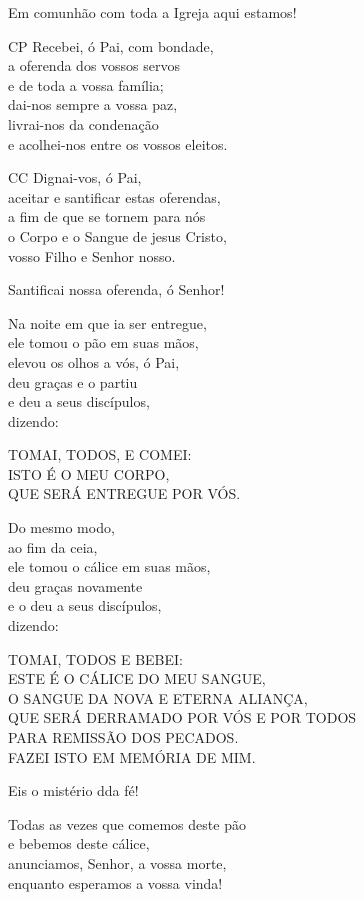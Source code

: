\documentclass{book}
\begin{document}
\begin{flushleft}
    Em comunhão com toda a Igreja aqui estamos!

    CP Recebei, ó Pai, com bondade, \\
    a oferenda dos vossos servos \\
    e de toda a vossa família; \\
    dai-nos sempre a vossa paz, \\
    livrai-nos da condenação \\
    e acolhei-nos entre os vossos eleitos.

    CC Dignai-vos, ó Pai, \\
    aceitar e santificar estas oferendas, \\
    a fim de que se tornem para nós \\
    o Corpo e o Sangue de jesus Cristo, \\
    vosso Filho e Senhor nosso.

    Santificai nossa oferenda, ó Senhor!

    Na noite em que ia ser entregue, \\
    ele tomou o pão em suas mãos, \\
    elevou os olhos a vós, ó Pai, \\
    deu graças e o partiu \\
    e deu a seus discípulos, \\
    dizendo:

    TOMAI, TODOS, E COMEI: \\
    ISTO É O MEU CORPO, \\
    QUE SERÁ ENTREGUE POR VÓS.

    Do mesmo modo, \\
    ao fim da ceia, \\
    ele tomou o cálice em suas mãos, \\
    deu graças novamente \\
    e o deu a seus discípulos, \\
    dizendo:

    TOMAI, TODOS E BEBEI: \\
    ESTE É O CÁLICE DO MEU SANGUE, \\
    O SANGUE DA NOVA E ETERNA ALIANÇA, \\
    QUE SERÁ DERRAMADO POR VÓS E POR TODOS \\
    PARA REMISSÃO DOS PECADOS. \\
    FAZEI ISTO EM MEMÓRIA DE MIM.

    Eis o mistério dda fé!

    Todas as vezes que comemos deste pão \\
    e bebemos deste cálice, \\
    anunciamos, Senhor, a vossa morte, \\
    enquanto esperamos a vossa vinda!


\end{flushleft}
\end{document}
